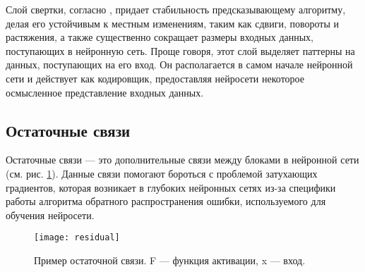 Слой свертки, согласно \cite{goodfellow}, придает стабильность предсказывающему
алгоритму, делая его устойчивым к местным изменениям, таким как сдвиги,
повороты и растяжения, а также существенно сокращает размеры входных данных,
поступающих в нейронную сеть. Проще говоря, этот слой выделяет паттерны на
данных, поступающих на его вход. Он располагается в самом начале нейронной сети
и действует как кодировщик, предоставляя нейросети некоторое осмысленное
представление входных данных.

\subsection{Остаточные связи}
Остаточные связи \cite{residual} --- это дополнительные связи между блоками
в нейронной сети (см. рис. \ref{fig:residual}). Данные связи помогают бороться с проблемой
затухающих градиентов, которая возникает в глубоких нейронных сетях из-за
специфики работы алгоритма обратного распространения ошибки, используемого для
обучения нейросети.

\begin{figure}[!htb]
	\centering
	\caption{Пример остаточной связи. F --- функция активации, x --- вход.}
	\texttt{[image: residual]}
	\label{fig:residual}
\end{figure}
